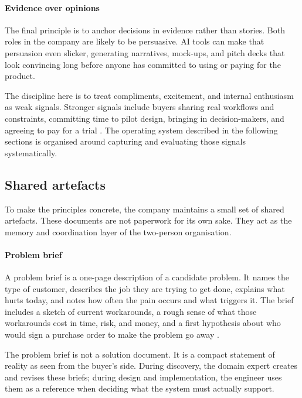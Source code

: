 \documentclass[10pt, a4paper, twocolumn]{article} %
\begin{document}
\newpage
\paragraph{Evidence over opinions}

The final principle is to anchor decisions in evidence rather than stories. Both roles in the company are likely to be persuasive. AI tools can make that persuasion even slicker, generating narratives, mock-ups, and pitch decks that look convincing long before anyone has committed to using or paying for the product.

The discipline here is to treat compliments, excitement, and internal enthusiasm as weak signals. Stronger signals include buyers sharing real workflows and constraints, committing time to pilot design, bringing in decision-makers, and agreeing to pay for a trial \citep{fitzpatrick2013mom,bland2019testing}. The operating system described in the following sections is organised around capturing and evaluating those signals systematically.

\subsection{Shared artefacts}

To make the principles concrete, the company maintains a small set of shared artefacts. These documents are not paperwork for its own sake. They act as the memory and coordination layer of the two-person organisation.

\paragraph{Problem brief}

A problem brief is a one-page description of a candidate problem. It names the type of customer, describes the job they are trying to get done, explains what hurts today, and notes how often the pain occurs and what triggers it. The brief includes a sketch of current workarounds, a rough sense of what those workarounds cost in time, risk, and money, and a first hypothesis about who would sign a purchase order to make the problem go away \citep{osterwalder2014vpd}.

The problem brief is not a solution document. It is a compact statement of reality as seen from the buyer’s side. During discovery, the domain expert creates and revises these briefs; during design and implementation, the engineer uses them as a reference when deciding what the system must actually support.
\end{document}
